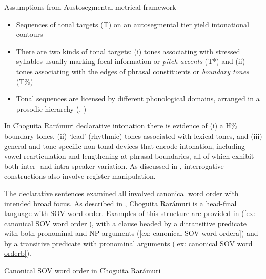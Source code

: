 \ea\label{ex: assumptions for analysis of CR intonation}
{Assumptions from Austosegmental-metrical framework}

\begin{itemize}
\item Sequences of tonal targets (T) on an autosegmental tier yield intonational contours
\item There are two kinds of tonal targets: (i) tones associating with stressed syllables usually marking focal information or \textit{pitch accents} (T*) and (ii) tones associating with the edges of phrasal constituents or \textit{boundary tones} (T\%)
\item Tonal sequences are licensed by different phonological domains, arranged in a prosodic hierarchy (\citealt{selkirk1986derived}, \citealt{nespor1986prosodic})
\end{itemize}

\z

\hspace*{-3pt}In Choguita Rarámuri declarative intonation there is evidence of (i) a H\% boundary tones, (ii) `lead' (rhythmic) tones associated with lexical tones, and (iii) general and tone-specific non-tonal devices that encode intonation, including vowel rearticulation and lengthening at phrasal boundaries, all of which exhibit both inter- and intra-speaker variation. As discussed in , interrogative constructions also involve register manipulation.

The declarative sentences examined all involved canonical word order with intended broad focus. As described in , Choguita Rarámuri is a head-final language with SOV word order. Examples of this structure are provided in (\ref{ex: canonical SOV word order}), with a clause headed by a ditransitive predicate with both pronominal and NP arguments (\ref{ex: canonical SOV word ordera}) and by a transitive predicate with pronominal arguments (\ref{ex: canonical SOV word orderb}).


\ea\label{ex: canonical SOV word order}
{Canonical SOV word order in Choguita Rarámuri}

